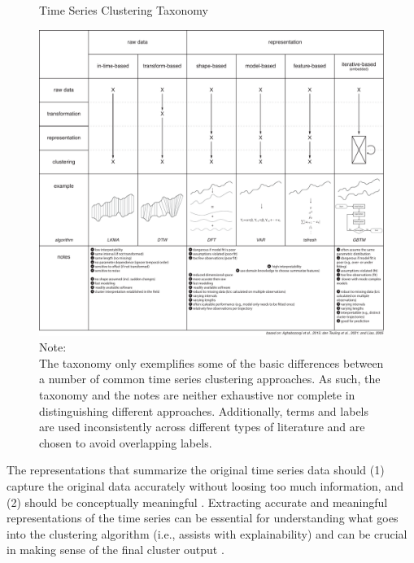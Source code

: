 \documentclass[man, 12pt, a4paper, mask, floatsintext]{apa7}
\theoremstyle{break}
\theoremstyle{plain}
\begin{document}
\begin{figure}[!hbtp] %
  \caption{Time Series Clustering Taxonomy}
  \label{fig:tsClustTax}
  \centering\includegraphics[width=\textwidth]{figures/TS Cluster Flow/tsClustTax.pdf}
  \caption*{Note: \\
  The taxonomy only exemplifies some of the basic differences between a number of common time series clustering approaches. As such, the taxonomy and the notes are neither exhaustive nor complete in distinguishing different approaches. Additionally, terms and labels are used inconsistently across different types of literature and are chosen to avoid overlapping labels.}
\end{figure}

The representations that summarize the original time series data should (1) capture the original data accurately without loosing too much information, and (2) should be conceptually meaningful \citep[e.g.,][]{vandermaaten2009}. Extracting accurate and meaningful representations of the time series can be essential for understanding what goes into the clustering algorithm (i.e., assists with explainability) and can be crucial in making sense of the final cluster output \citep[i.e., assists with interpretability; e.g.,][]{Kennedy2021}. 
\end{document}
